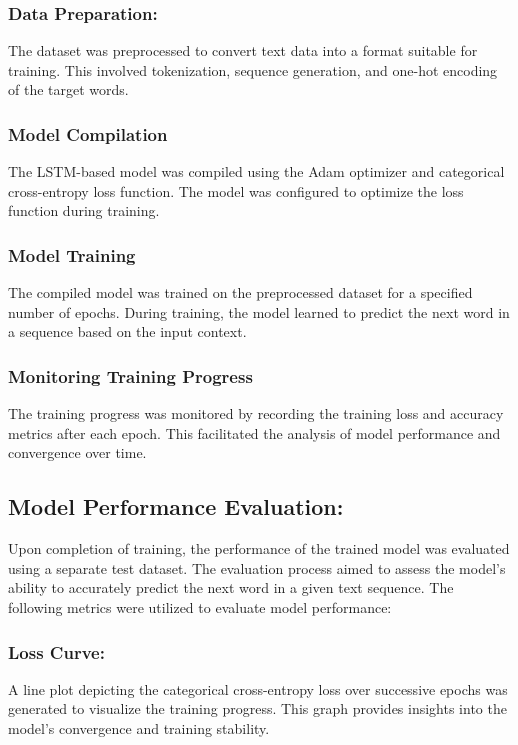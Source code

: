 \documentclass[conference]{IEEEtran}
\begin{document}
\subsubsection{Data Preparation: }
    The dataset was preprocessed to convert text data into a format suitable for training. This involved tokenization, sequence generation, and one-hot encoding of the target words.
    
\subsubsection{ Model Compilation}
     The LSTM-based model was compiled using the Adam optimizer and categorical cross-entropy loss function. The model was configured to optimize the loss function during training.
    
   
\subsubsection{ Model Training}
    The compiled model was trained on the preprocessed dataset for a specified number of epochs. During training, the model learned to predict the next word in a sequence based on the input context.

\subsubsection{Monitoring Training Progress}
    The training progress was monitored by recording the training loss and accuracy metrics after each epoch. This facilitated the analysis of model performance and convergence over time.


\subsection{Model Performance Evaluation:}

Upon completion of training, the performance of the trained model was evaluated using a separate test dataset. The evaluation process aimed to assess the model's ability to accurately predict the next word in a given text sequence. The following metrics were utilized to evaluate model performance:

\subsubsection{\textbf{Loss Curve:}}
 A line plot depicting the categorical cross-entropy loss over successive epochs was generated to visualize the training progress. This graph provides insights into the model's convergence and training stability.
\end{document}
